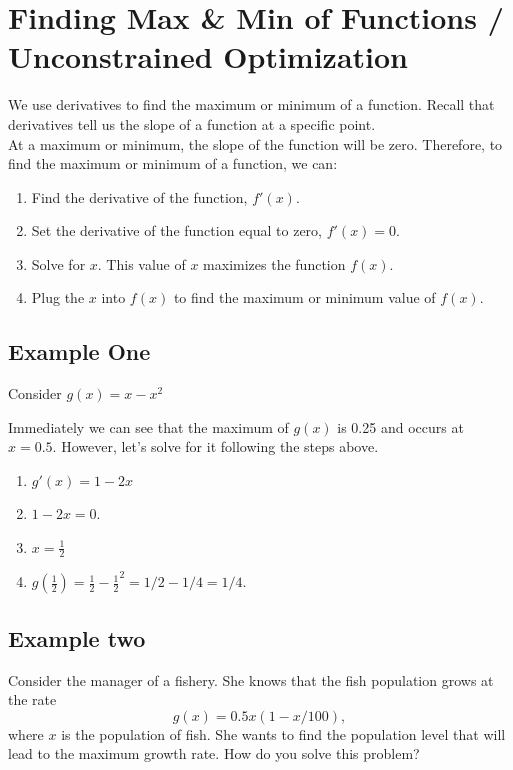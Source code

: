 \documentclass{article}
\begin{document}
\section{Finding Max \& Min of Functions / Unconstrained Optimization}
We use derivatives to find the maximum or minimum of a function. Recall that derivatives tell us the slope of a function at a specific point. \\

At a maximum or minimum, the slope of the function will be zero. Therefore, to find the maximum or minimum of a function, we can:
\begin{enumerate}
    \item Find the derivative of the function, $f'(x)$.
    \item Set the derivative of the function equal to zero, $f'(x) = 0$.
    \item Solve for $x$. This value of $x$ maximizes the function $f(x)$.
    \item Plug the $x$ into $f(x)$ to find the maximum or minimum value of $f(x)$.
\end{enumerate}

\subsection{Example One}
Consider $g(x) = x - x^2$\\



Immediately we can see that the maximum of $g(x)$ is 0.25 and occurs at $x = 0.5$. However, let's solve for it following the steps above. 

\begin{enumerate}
    \item $g'(x) = 1 - 2x$
    \item $1 - 2x = 0$.
    \item $x = \frac{1}{2}$
    \item $g(\frac{1}{2}) = \frac{1}{2} - \frac{1}{2}^2= 1/2 - 1/4 = 1/4$.
\end{enumerate}

\subsection{Example two}
Consider the manager of a fishery. She knows that the fish population grows at the rate $$g(x) = 0.5x(1 - x/100),$$ where $x$ is the population of fish. She wants to find the population level that will lead to the maximum growth rate. How do you solve this problem?\\
\end{document}
